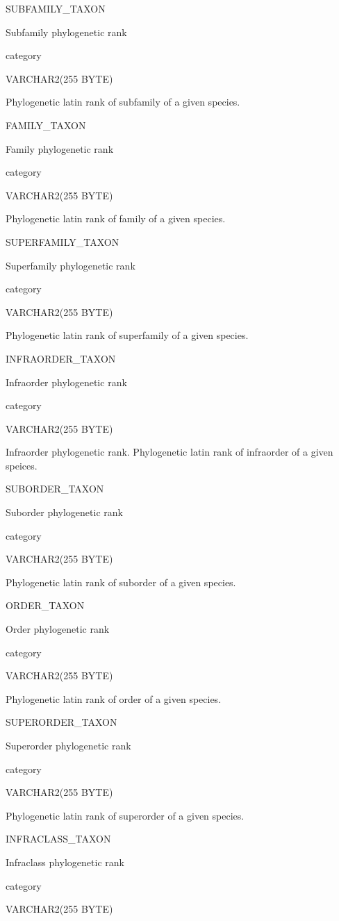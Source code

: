 \documentclass[
  letterpaper,
  oneside,
  open=any]{scrbook}
\begin{document}
SUBFAMILY\_TAXON

Subfamily phylogenetic rank

category

VARCHAR2(255 BYTE)

Phylogenetic latin rank of subfamily of a given species.

FAMILY\_TAXON

Family phylogenetic rank

category

VARCHAR2(255 BYTE)

Phylogenetic latin rank of family of a given species.

SUPERFAMILY\_TAXON

Superfamily phylogenetic rank

category

VARCHAR2(255 BYTE)

Phylogenetic latin rank of superfamily of a given species.

INFRAORDER\_TAXON

Infraorder phylogenetic rank

category

VARCHAR2(255 BYTE)

Infraorder phylogenetic rank. Phylogenetic latin rank of infraorder of a
given speices.

SUBORDER\_TAXON

Suborder phylogenetic rank

category

VARCHAR2(255 BYTE)

Phylogenetic latin rank of suborder of a given species.

ORDER\_TAXON

Order phylogenetic rank

category

VARCHAR2(255 BYTE)

Phylogenetic latin rank of order of a given species.

SUPERORDER\_TAXON

Superorder phylogenetic rank

category

VARCHAR2(255 BYTE)

Phylogenetic latin rank of superorder of a given species.

INFRACLASS\_TAXON

Infraclass phylogenetic rank

category

VARCHAR2(255 BYTE)
\end{document}
